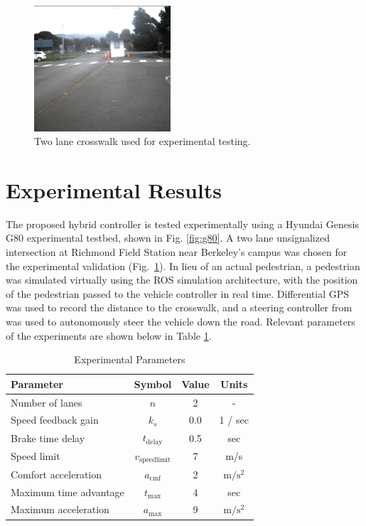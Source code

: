 \documentclass[letterpaper, 10 pt, conference]{ieeeconf}  %
\begin{document}
\begin{figure}[h]
\centering
\includegraphics[width=2.0in]{figures/crosswalkPic.png}
\caption{Two lane crosswalk used for experimental testing.}
\label{fig:crosswalkpic}
\end{figure}


\section{Experimental Results}
\label{sec:expres}


The proposed hybrid controller is tested experimentally using a Hyundai Genesis G80 experimental testbed, shown in Fig. \ref{fig:g80}. A two lane unsignalized intersection at Richmond Field Station near Berkeley's campus was chosen for the experimental validation (Fig.~\ref{fig:crosswalkpic}).  In lieu of an actual pedestrian, a pedestrian was simulated virtually using the ROS simulation architecture, with the position of the pedestrian passed to the vehicle controller in real time. Differential GPS was used to record the distance to the crosswalk, and a steering controller from \cite{Kapania2015} was used to autonomously steer the vehicle down the road. Relevant parameters of the experiments are shown below in Table \ref{tb:expparams}.

\begin{table}[h]
\footnotesize
\begin{center}
\caption{Experimental Parameters}\label{tb:expparams}
\begin{tabular}{lccc}
Parameter & Symbol & Value & Units \\\hline\hline
Number of lanes & $n$ & 2 & - \\
Speed feedback gain & $k_s$ & 0.0 & 1 / sec\\
Brake time delay    & $t_\mathrm{delay}$ & 0.5 & sec \\ 
Speed limit & $v_\mathrm{speedlimit}$ & 7 & m/s \\
Comfort acceleration & $a_\mathrm{cmf}$ & 2 & $\mathrm{m/s^2}$ \\
Maximum time advantage & $t_\mathrm{max}$ & 4 & sec \\
Maximum acceleration & $a_\mathrm{max}$ & 9 & $\mathrm{m/s^2}$ \\\hline
\end{tabular}
\end{center}
\end{table}
\end{document}
